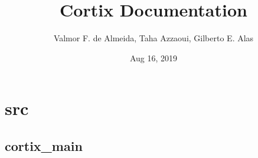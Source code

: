 \documentclass[letterpaper,10pt,openany,oneside,english]{sphinxmanual}
\title{Cortix Documentation}
\date{Aug 16, 2019}
\author{Valmor F. de Almeida, Taha Azzaoui, Gilberto E. Alas}
\begin{document}
\maketitle
\sphinxtableofcontents
{}\label{\detokenize{contents::doc}}



\chapter{src}
\label{\detokenize{src_rst/modules:src}}\label{\detokenize{src_rst/modules::doc}}

\section{cortix\_main}
\label{\detokenize{src_rst/cortix_main:module-cortix_main}}\label{\detokenize{src_rst/cortix_main:cortix-main}}\label{\detokenize{src_rst/cortix_main::doc}}
\end{document}
